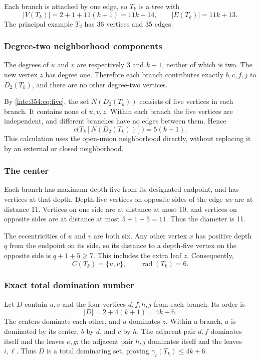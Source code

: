 \documentclass[11pt,a4paper]{article}
\theoremstyle{definition}\newtheorem{definition}[theorem]{Definition}
\theoremstyle{remark}\newtheorem{remark}[theorem]{Remark}
\begin{document}
Each branch is attached by one edge, so $T_k$ is a tree with
\[
|V(T_k)|=2+1+11(k+1)=11k+14,\qquad |E(T_k)|=11k+13.
\]
The principal example $T_2$ has 36 vertices and 35 edges.

\subsubsection{Degree-two neighborhood components}
The degrees of $u$ and $v$ are respectively 3 and $k+1$, neither of which is two. The new vertex $z$ has degree one. Therefore each branch contributes exactly $b,c,f,j$ to $D_2(T_k)$, and there are no other degree-two vertices.

By \eqref{late:354:eq:five}, the set $N(D_2(T_k))$ consists of five vertices in each branch. It contains none of $u,v,z$. Within each branch the five vertices are independent, and different branches have no edges between them. Hence
\begin{equation}
c\bigl(T_k[N(D_2(T_k))]\bigr)=5(k+1).
\label{late:354:eq:components}
\end{equation}
This calculation uses the open-union neighborhood directly, without replacing it by an external or closed neighborhood.

\subsubsection{The center}
Each branch has maximum depth five from its designated endpoint, and has vertices at that depth. Depth-five vertices on opposite sides of the edge $uv$ are at distance 11. Vertices on one side are at distance at most 10, and vertices on opposite sides are at distance at most $5+1+5=11$. Thus the diameter is 11.

The eccentricities of $u$ and $v$ are both six. Any other vertex $x$ has positive depth $q$ from the endpoint on its side, so its distance to a depth-five vertex on the opposite side is $q+1+5\ge7$. This includes the extra leaf $z$. Consequently,
\begin{equation}
C(T_k)=\{u,v\},\qquad \operatorname{rad}(T_k)=6.
\label{late:354:eq:center}
\end{equation}

\subsubsection{Exact total domination number}
Let $D$ contain $u,v$ and the four vertices $d,f,h,j$ from each branch. Its order is
\[
|D|=2+4(k+1)=4k+6.
\]
The centers dominate each other, and $u$ dominates $z$. Within a branch, $a$ is dominated by its center, $b$ by $d$, and $c$ by $h$. The adjacent pair $d,f$ dominates itself and the leaves $e,g$; the adjacent pair $h,j$ dominates itself and the leaves $i,\ell$. Thus $D$ is a total dominating set, proving $\gamma_t(T_k)\le4k+6$.
\end{document}
